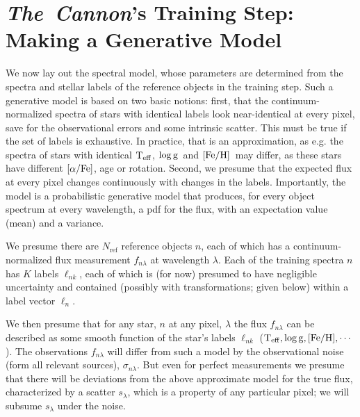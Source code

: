 \documentclass[12pt, preprint]{aastex}
\newcommand{\tc}{\textsl{The~Cannon}}
\newcommand{\set}[1]{\bm{#1}}
\newcommand{\starlabel}{\ell}
\newcommand{\starlabelvec}{\set{\starlabel}}
\newcommand{\teff}{\mbox{$\rm T_{eff}$}}
\newcommand{\feh}{\mbox{$\rm [Fe/H]$}}
\newcommand{\alphafe}{\mbox{$\rm [\alpha/Fe]$}}
\newcommand{\logg}{\mbox{$\rm \log g$}}
\newcommand{\noise}{\sigma_{n\lambda}}
\newcommand{\scatter}{s_{\lambda}}
\newcommand{\rfn}{\mathrm{ref}}
\begin{document}
\section{\tc 's Training Step: Making a Generative Model}
\label{sec:spectralmodel}

We now lay out the spectral model, whose parameters are determined 
from the spectra and stellar labels of the reference objects in the training step.
Such a generative model is based on two basic notions: first, that the continuum-normalized spectra of
stars with identical labels look near-identical at every pixel, save for the observational errors
and some intrinsic scatter. This must be true if the set of labels is exhaustive. 
In practice, that is an approximation, as e.g. the spectra of stars with identical \teff , \logg \ and \feh\ may differ, 
as these stars have different \alphafe , age or rotation. Second, we presume that the expected flux at every pixel changes continuously
with changes in the labels.
Importantly, the model is a probabilistic generative model that produces,
for every object spectrum at every wavelength,
a pdf for the flux, with an expectation value (mean) and a variance.

We presume there are $N_\rfn$ reference objects $n$, each of which has
a continuum-normalized flux measurement $f_{n\lambda}$ at wavelength
$\lambda$. Each of the training spectra $n$ has $K$ labels $\starlabel_{nk}$, each of which
is (for now) presumed to have negligible uncertainty and contained (possibly with transformations; given below)
within a label vector $\starlabelvec_n$.

We then presume that for any star, $n$ at any pixel, $\lambda$  the flux $f_{n\lambda}$  can be described as some smooth function of the star's labels $\starlabel_{nk}$
($\teff,\logg,\feh,\cdots$).
The observations $f_{n\lambda}$ will differ from such a model by the observational noise (form all relevant sources), $\noise$. But even for perfect measurements we presume that there will be
deviations from the above approximate model for the true flux, characterized by a scatter $\scatter$,
which is a property of any particular pixel; we will subsume $\scatter$ under the noise.
\end{document}
